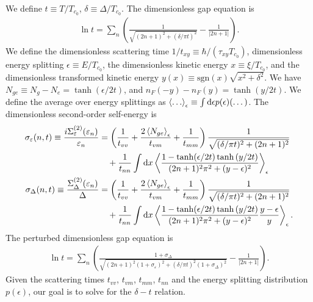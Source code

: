 \documentclass[aps,prl,preprint]{revtex4-2}
\begin{document}
We define $t \equiv T/T_{c_0}$, $\delta \equiv \Delta/T_{c_0}$. The
dimensionless gap equation is
\begin{align}
    \ln{t} = \sum_n\left(\frac{1}{\sqrt{(2n+1)^2 + (\delta/\pi t)^2}} - \frac{1}{|2n+1|}\right).
\end{align}
We define the dimensionless scattering time $1/t_{xy} \equiv \hbar/(\tau_{xy}T_{c_0})$,
dimensionless energy splitting $\epsilon \equiv E/T_{c_0}$,
the dimensionless kinetic energy $x \equiv \xi/T_{c_0}$,
and the dimensionless transformed kinetic energy $y(x) \equiv \text{sgn}(x)\sqrt{x^2 + \delta^2}$.
We have $N_{ge} \equiv N_g - N_e = \tanh(\epsilon/2t)$, and $n_F(-y) - n_F(y) = \tanh(y/2t)$.
We define the average over energy splittings as $\ev{\dots}_\epsilon \equiv \int\dd\epsilon p(\epsilon)(\dots)$.
The dimensionless second-order self-energy is
\begin{align}
    \sigma_\varepsilon(n,t) \equiv \frac{i\Sigma^{(2)}_\varepsilon(\varepsilon_n)}{\varepsilon_n} & = \left(\frac{1}{t_{vv}} + \frac{2\ev{N_{ge}}_\epsilon}{t_{vm}} + \frac{1}{t_{mm}}\right)\frac{1}{\sqrt{(\delta/\pi t)^2+(2n+1)^2}}   \nonumber \\
                                                                                                  & \quad + \frac{1}{t_{nn}}\int\dd x\ev{\frac{1-\tanh(\epsilon/2t)\tanh{(y/2t)}}{(2n+1)^2\pi^2 + (y-\epsilon)^2}}_\epsilon                         \\
    \sigma_\Delta(n,t) \equiv \frac{\Sigma^{(2)}_\Delta(\varepsilon_n)}{\Delta}                   & = \left(\frac{1}{t_{vv}} + \frac{2\ev{N_{ge}}_\epsilon}{t_{vm}} + \frac{1}{t_{mm}}\right)\frac{1}{\sqrt{(\delta/\pi t)^2+(2n+1)^2}}   \nonumber \\
                                                                                                  & \quad + \frac{1}{t_{nn}}\int\dd x\ev{\frac{1-\tanh(\epsilon/2t)\tanh{(y/2t)}}{(2n+1)^2\pi^2 + (y-\epsilon)^2}\frac{y-\epsilon}{y}}_\epsilon.
\end{align}
The perturbed dimensionless gap equation is
\begin{align}
    \ln{t} = \sum_n\left(\frac{1 + \sigma_\Delta}{\sqrt{(2n+1)^2(1 + \sigma_\varepsilon)^2 + (\delta/\pi t)^2(1 + \sigma_\Delta)^2}} - \frac{1}{|2n+1|}\right).
\end{align}
Given the scattering times $t_{vv}$, $t_{vm}$, $t_{mm}$, $t_{nn}$ and the energy splitting distribution $p(\epsilon)$, our goal is to solve for the $\delta - t$ relation.
\end{document}
